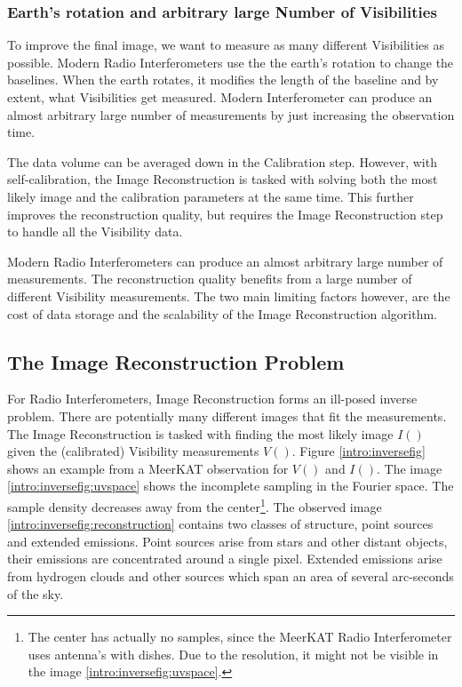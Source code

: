 \subsubsection{Earth's rotation and arbitrary large Number of Visibilities}
To improve the final image, we want to measure as many different Visibilities as possible. Modern Radio Interferometers use the the earth's rotation to change the baselines. When the earth rotates, it modifies the length of the baseline and by extent, what Visibilities get measured. Modern Interferometer can produce an almost arbitrary large number of measurements by just increasing the observation time.

The data volume can be averaged down in the Calibration step. However, with self-calibration, the Image Reconstruction is tasked with solving both the most likely image and the calibration parameters at the same time. This further improves the reconstruction quality\cite{Wiauxselfcal}, but requires the Image Reconstruction step to handle all the Visibility data.

Modern Radio Interferometers can produce an almost arbitrary large number of measurements. The reconstruction quality benefits from a large number of different Visibility measurements. The two main limiting factors however, are the cost of data storage and the scalability of the Image Reconstruction algorithm.


\subsection{The Image Reconstruction Problem}
For Radio Interferometers, Image Reconstruction forms an ill-posed inverse problem. There are potentially many different images that fit the measurements. The Image Reconstruction is tasked with finding the most likely image $I()$ given the (calibrated) Visibility measurements $V()$.  Figure \ref{intro:inversefig} shows an example from a MeerKAT observation for $V()$ and $I()$. The image \ref{intro:inversefig:uvspace} shows the incomplete sampling in the Fourier space. The sample density decreases away from the center\footnote{The center has actually no samples, since the MeerKAT Radio Interferometer uses antenna's with dishes. Due to the resolution, it might not be visible in the image \ref{intro:inversefig:uvspace}.}. The observed image \ref{intro:inversefig:reconstruction} contains two classes of structure, point sources and extended emissions. Point sources arise from stars and other distant objects, their emissions are concentrated around a single pixel. Extended emissions arise from hydrogen clouds and other sources which span an area of several arc-seconds of the sky.

